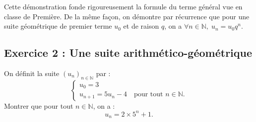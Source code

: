 \documentclass[11pt,a4paper]{article}
\newcommand{\N}{\mathbb{N}}
\begin{document}
\begin{remarquabox}
Cette démonstration fonde rigoureusement la formule du terme général vue en classe de Première. De la même façon, on démontre par récurrence que pour une suite géométrique de premier terme $u_0$ et de raison $q$, on a $\forall n \in \N, \; u_n = u_0 q^n$.
\end{remarquabox}

\subsection*{Exercice 2 : Une suite arithmético-géométrique}

On définit la suite $(u_n)_{n \in \N}$ par :
\[
\begin{cases}
u_0 = 3 \\
u_{n+1} = 5u_n - 4 \quad \text{pour tout } n \in \N.
\end{cases}
\]
Montrer que pour tout $n \in \N$, on a :
\[
u_n = 2 \times 5^n + 1.
\]
\end{document}
